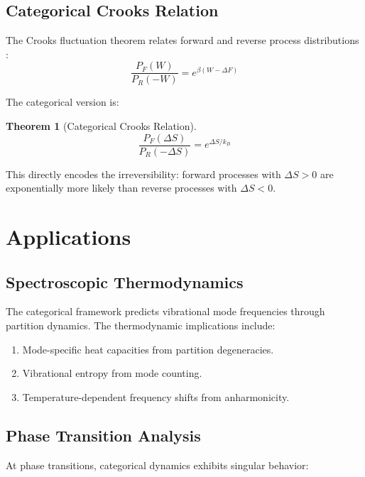 \documentclass[twocolumn,10pt]{article}
\newtheorem{theorem}{Theorem}[section]
\begin{document}
\subsection{Categorical Crooks Relation}

The Crooks fluctuation theorem relates forward and reverse process distributions \cite{crooks1999}:
\begin{equation}
    \frac{P_F(W)}{P_R(-W)} = e^{\beta(W - \Delta F)}
\end{equation}

The categorical version is:

\begin{theorem}[Categorical Crooks Relation]
\begin{equation}
    \frac{P_F(\Delta S)}{P_R(-\Delta S)} = e^{\Delta S/k_B}
\end{equation}
\end{theorem}

This directly encodes the irreversibility: forward processes with $\Delta S > 0$ are exponentially more likely than reverse processes with $\Delta S < 0$.

\section{Applications}

\subsection{Spectroscopic Thermodynamics}

The categorical framework predicts vibrational mode frequencies through partition dynamics. The thermodynamic implications include:

\begin{enumerate}
    \item Mode-specific heat capacities from partition degeneracies.
    \item Vibrational entropy from mode counting.
    \item Temperature-dependent frequency shifts from anharmonicity.
\end{enumerate}

\subsection{Phase Transition Analysis}

At phase transitions, categorical dynamics exhibits singular behavior:
\end{document}
